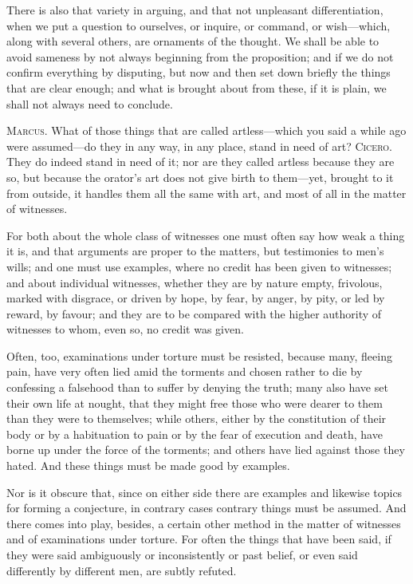  There is also that variety in arguing, and that not unpleasant differentiation, when we put a question to ourselves, or inquire, or command, or wish—which, along with several others, are ornaments of the thought. We shall be able to avoid sameness by not always beginning from the proposition; and if we do not confirm everything by disputing, but now and then set down briefly the things that are clear enough; and what is brought about from these, if it is plain, we shall not always need to conclude.

 \textsc{Marcus.} What of those things that are called artless—which you said a while ago were assumed—do they in any way, in any place, stand in need of art? \textsc{Cicero.} They do indeed stand in need of it; nor are they called artless because they are so, but because the orator's art does not give birth to them—yet, brought to it from outside, it handles them all the same with art, and most of all in the matter of witnesses.

 For both about the whole class of witnesses one must often say how weak a thing it is, and that arguments are proper to the matters, but testimonies to men's wills; and one must use examples, where no credit has been given to witnesses; and about individual witnesses, whether they are by nature empty, frivolous, marked with disgrace, or driven by hope, by fear, by anger, by pity, or led by reward, by favour; and they are to be compared with the higher authority of witnesses to whom, even so, no credit was given.

 Often, too, examinations under torture must be resisted, because many, fleeing pain, have very often lied amid the torments and chosen rather to die by confessing a falsehood than to suffer by denying the truth; many also have set their own life at nought, that they might free those who were dearer to them than they were to themselves; while others, either by the constitution of their body or by a habituation to pain or by the fear of execution and death, have borne up under the force of the torments; and others have lied against those they hated. And these things must be made good by examples.

 Nor is it obscure that, since on either side there are examples and likewise topics for forming a conjecture, in contrary cases contrary things must be assumed. And there comes into play, besides, a certain other method in the matter of witnesses and of examinations under torture. For often the things that have been said, if they were said ambiguously or inconsistently or past belief, or even said differently by different men, are subtly refuted.

